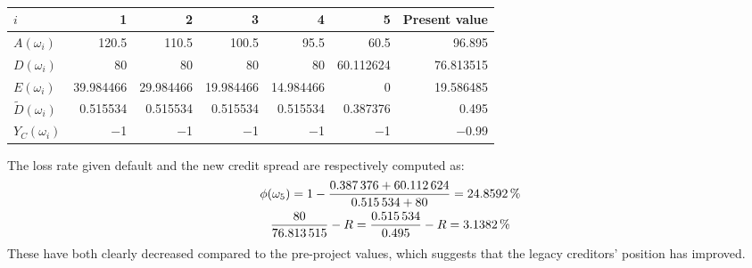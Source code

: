 \documentclass[main.tex]{subfiles}
\begin{document}
        \begin{table}[H]
            \centering
            \begin{tabular}{l|rrrrr||r}
                $i$ & 1 & 2 & 3 & 4 & 5 & Present value \\
                \hline
                $A(\omega_{i})$ & 
                    \num{120.5} & \num{110.5} & \num{100.5} & \num{95.5} & \num{60.5} & \num{96.895} \\
                $D(\omega_{i})$ & 
                    \num{80} & \num{80} & \num{80} & \num{80} & \num{60.112624} & \num{76.813515} \\
                $E(\omega_{i})$ & 
                    \num{39.984466} & \num{29.984466} & \num{19.984466} & \num{14.984466} & \num{0} & \num{19.586485}\\
                $\tilde{D}(\omega_{i})$ & 
                    \num{0.515534} & \num{0.515534} & \num{0.515534} & \num{0.515534} & \num{0.387376} & \num{0.495}\\
                $Y_C(\omega_{i})$ & 
                    \num{-1} & \num{-1} & \num{-1} & \num{-1} & \num{-1} & \num{-0.99} \\
            \end{tabular}
            \caption{}
            \label{tbl:example-collateralized-derivative}
        \end{table}
        The loss rate given default and the new credit spread are respectively computed as:
            \begin{gather*}
                \phi(\omega_{5})
                = 
                    1 
                    - 
                    \frac{
                        \num{0.387376}+\num{60.112624}
                    }{
                        \num{0.515534}+\num{80}
                    }
                = 
                    \pct{0.248592}
                \\
                    \frac{
                        \num{80}    
                    }{
                        \num{76.813515} 
                    } 
                    - 
                    \grossrfrate 
                = 
                    \frac{
                        \num{0.515534}
                    }{        
                        \num{0.495}
                    } 
                    -
                    \grossrfrate 
                = 
                    \pct{0.031382} 
            \end{gather*}
        These have both clearly decreased compared to the pre-project values, 
        which suggests that the legacy creditors' position has improved.
\end{document}
